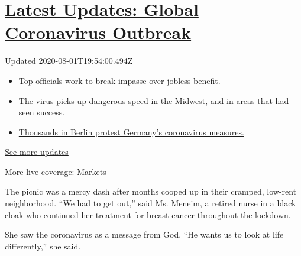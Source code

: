 \hypertarget{latest-updates-global-coronavirus-outbreak}{%
\section{\texorpdfstring{\href{https://www.nytimes3xbfgragh.onion/2020/08/01/world/coronavirus-covid-19.html?action=click\&pgtype=Article\&state=default\&region=MAIN_CONTENT_1\&context=storylines_live_updates}{Latest
Updates: Global Coronavirus
Outbreak}}{Latest Updates: Global Coronavirus Outbreak}}\label{latest-updates-global-coronavirus-outbreak}}

Updated 2020-08-01T19:54:00.494Z

\begin{itemize}
\tightlist
\item
  \href{https://www.nytimes3xbfgragh.onion/2020/08/01/world/coronavirus-covid-19.html?action=click\&pgtype=Article\&state=default\&region=MAIN_CONTENT_1\&context=storylines_live_updates\#link-3ac56579}{Top
  officials work to break impasse over jobless benefit.}
\item
  \href{https://www.nytimes3xbfgragh.onion/2020/08/01/world/coronavirus-covid-19.html?action=click\&pgtype=Article\&state=default\&region=MAIN_CONTENT_1\&context=storylines_live_updates\#link-8796723}{The
  virus picks up dangerous speed in the Midwest, and in areas that had
  seen success.}
\item
  \href{https://www.nytimes3xbfgragh.onion/2020/08/01/world/coronavirus-covid-19.html?action=click\&pgtype=Article\&state=default\&region=MAIN_CONTENT_1\&context=storylines_live_updates\#link-25930521}{Thousands
  in Berlin protest Germany's coronavirus measures.}
\end{itemize}

\href{https://www.nytimes3xbfgragh.onion/2020/08/01/world/coronavirus-covid-19.html?action=click\&pgtype=Article\&state=default\&region=MAIN_CONTENT_1\&context=storylines_live_updates}{See
more updates}

More live coverage:
\href{https://www.nytimes3xbfgragh.onion/live/2020/07/31/business/stock-market-today-coronavirus?action=click\&pgtype=Article\&state=default\&region=MAIN_CONTENT_1\&context=storylines_live_updates}{Markets}

The picnic was a mercy dash after months cooped up in their cramped,
low-rent neighborhood. ``We had to get out,'' said Ms. Meneim, a retired
nurse in a black cloak who continued her treatment for breast cancer
throughout the lockdown.

She saw the coronavirus as a message from God. ``He wants us to look at
life differently,'' she said.

